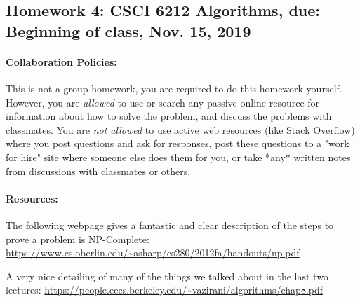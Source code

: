 \documentclass[11pt,letterpaper]{article}
\begin{document}
\subsection*{Homework 4: CSCI 6212 Algorithms, due: Beginning of class, Nov. 15, 2019}
    \paragraph{Collaboration Policies:} This is not a group homework, you are required to do this homework yourself.  However, you are {\em allowed} to use or search any passive online resource for information about how to solve the problem, and discuss the problems with classmates.  
    You are {\em not allowed} to use active web resources (like Stack Overflow) where you post questions and ask for responses, post these questions to a "work for hire" site where someone else does them for you, or take *any* written notes from discussions with classmates or others. 
\paragraph{Resources:} The following webpage gives a fantastic and clear description of the steps to prove a problem is NP-Complete: \url{https://www.cs.oberlin.edu/~asharp/cs280/2012fa/handouts/np.pdf}

A very nice detailing of many of the things we talked about in the last two lectures:
\url{https://people.eecs.berkeley.edu/~vazirani/algorithms/chap8.pdf}
\end{document}
